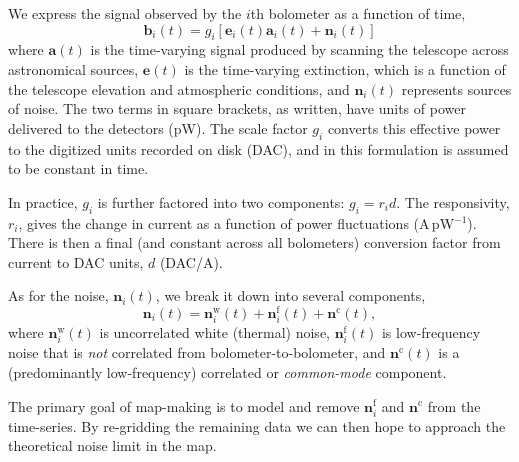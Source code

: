 \documentclass[useAMS,usenatbib,nofootinbib]{mn2e}
\begin{document}
We express the signal observed by the $i$th bolometer as a function of time,
\begin{equation}
\mathbf{b}_i(t) = g_i[\mathbf{e}_i(t) \mathbf{a}_i(t) + \mathbf{n}_i(t)]
\end{equation}
where $\mathbf{a}(t)$ is the time-varying signal produced by scanning
the telescope across astronomical sources, $\mathbf{e}(t)$ is the
time-varying extinction, which is a function of the telescope
elevation and atmospheric conditions, and $\mathbf{n}_i(t)$ represents
sources of noise. The two terms in square brackets, as written, have
units of power delivered to the detectors (pW). The scale factor $g_i$
converts this effective power to the digitized units recorded on disk
(DAC), and in this formulation is assumed to be constant in time.

In practice, $g_i$ is further factored into two components: $g_i = r_i
d$. The responsivity, $r_i$, gives the change in current as a function
of power fluctuations (A\,pW$^{-1}$). There is then a final (and
constant across all bolometers) conversion factor from current to DAC
units, $d$ (DAC/A).

As for the noise, $\mathbf{n}_i(t)$, we break it down into several
components,
%
\begin{equation}
  \mathbf{n}_i(t) = \mathbf{n}^\mathrm{w}_i(t) + \mathbf{n}^\mathrm{f}_i(t) +
  \mathbf{n}^\mathrm{c}(t),
\end{equation}
%
where $\mathbf{n}^\mathrm{w}_i(t)$ is uncorrelated white (thermal)
noise, $\mathbf{n}^\mathrm{f}_i(t)$ is low-frequency noise that is
\emph{not} correlated from bolometer-to-bolometer, and
$\mathbf{n}^\mathrm{c}(t)$ is a (predominantly low-frequency)
correlated or \emph{common-mode} component.

The primary goal of map-making is to model and remove
$\mathbf{n}^\mathrm{f}_i$ and $\mathbf{n}^\mathrm{c}$ from the
time-series. By re-gridding the remaining data we can then hope to
approach the theoretical noise limit in the map.
\end{document}
